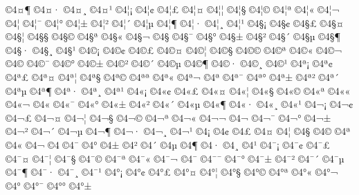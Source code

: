 {^^a94^^a4^^b6
^^a94^^a4^^b7
^^a94^^a4^^b8
^^a94^^a4^^b9
^^a94^^a6^^a1
^^a94^^a6^^a2
^^a94^^a6^^a3
^^a94^^a6^^a4
^^a94^^a6^^a6
^^a94^^a6^^a7
^^a94^^a6^^a9
^^a94^^a6^^aa
^^a94^^a6^^ab
^^a94^^a6^^ac
^^a94^^a6^^ad
^^a94^^a6^^af
^^a94^^a6^^b0
^^a94^^a6^^b1
^^a94^^a6^^b2
^^a94^^a6^^b4
^^a94^^a6^^b5
^^a94^^a6^^b6
^^a94^^a6^^b7
^^a94^^a6^^b8
^^a94^^a6^^b9
^^a94^^a7^^a1
^^a94^^a7^^a2
^^a94^^a7^^a3
^^a94^^a7^^a4
^^a94^^a7^^a6
^^a94^^a7^^a7
^^a94^^a7^^a9
^^a94^^a7^^aa
^^a94^^a7^^ab
^^a94^^a7^^ac
^^a94^^a7^^ad
^^a94^^a7^^af
^^a94^^a7^^b0
^^a94^^a7^^b1
^^a94^^a7^^b2
^^a94^^a7^^b4
^^a94^^a7^^b5
^^a94^^a7^^b6
^^a94^^a7^^b7
^^a94^^a7^^b8
^^a94^^a7^^b9
^^a94^^a9^^a1
^^a94^^a9^^a2
^^a94^^a9^^a3
^^a94^^a9^^a4
^^a94^^a9^^a6
^^a94^^a9^^a7
^^a94^^a9^^a9
^^a94^^a9^^aa
^^a94^^a9^^ab
^^a94^^a9^^ac
^^a94^^a9^^ad
^^a94^^a9^^af
^^a94^^a9^^b0
^^a94^^a9^^b1
^^a94^^a9^^b2
^^a94^^a9^^b4
^^a94^^a9^^b5
^^a94^^a9^^b6
^^a94^^a9^^b7
^^a94^^a9^^b8
^^a94^^a9^^b9
^^a94^^aa^^a1
^^a94^^aa^^a2
^^a94^^aa^^a3
^^a94^^aa^^a4
^^a94^^aa^^a6
^^a94^^aa^^a7
^^a94^^aa^^a9
^^a94^^aa^^aa
^^a94^^aa^^ab
^^a94^^aa^^ac
^^a94^^aa^^ad
^^a94^^aa^^af
^^a94^^aa^^b0
^^a94^^aa^^b1
^^a94^^aa^^b2
^^a94^^aa^^b4
^^a94^^aa^^b5
^^a94^^aa^^b6
^^a94^^aa^^b7
^^a94^^aa^^b8
^^a94^^aa^^b9
^^a94^^ab^^a1
^^a94^^ab^^a2
^^a94^^ab^^a3
^^a94^^ab^^a4
^^a94^^ab^^a6
^^a94^^ab^^a7
^^a94^^ab^^a9
^^a94^^ab^^aa
^^a94^^ab^^ab
^^a94^^ab^^ac
^^a94^^ab^^ad
^^a94^^ab^^af
^^a94^^ab^^b0
^^a94^^ab^^b1
^^a94^^ab^^b2
^^a94^^ab^^b4
^^a94^^ab^^b5
^^a94^^ab^^b6
^^a94^^ab^^b7
^^a94^^ab^^b8
^^a94^^ab^^b9
^^a94^^ac^^a1
^^a94^^ac^^a2
^^a94^^ac^^a3
^^a94^^ac^^a4
^^a94^^ac^^a6
^^a94^^ac^^a7
^^a94^^ac^^a9
^^a94^^ac^^aa
^^a94^^ac^^ab
^^a94^^ac^^ac
^^a94^^ac^^ad
^^a94^^ac^^af
^^a94^^ac^^b0
^^a94^^ac^^b1
^^a94^^ac^^b2
^^a94^^ac^^b4
^^a94^^ac^^b5
^^a94^^ac^^b6
^^a94^^ac^^b7
^^a94^^ac^^b8
^^a94^^ac^^b9
^^a94^^ad^^a1
^^a94^^ad^^a2
^^a94^^ad^^a3
^^a94^^ad^^a4
^^a94^^ad^^a6
^^a94^^ad^^a7
^^a94^^ad^^a9
^^a94^^ad^^aa
^^a94^^ad^^ab
^^a94^^ad^^ac
^^a94^^ad^^ad
^^a94^^ad^^af
^^a94^^ad^^b0
^^a94^^ad^^b1
^^a94^^ad^^b2
^^a94^^ad^^b4
^^a94^^ad^^b5
^^a94^^ad^^b6
^^a94^^ad^^b7
^^a94^^ad^^b8
^^a94^^ad^^b9
^^a94^^af^^a1
^^a94^^af^^a2
^^a94^^af^^a3
^^a94^^af^^a4
^^a94^^af^^a6
^^a94^^af^^a7
^^a94^^af^^a9
^^a94^^af^^aa
^^a94^^af^^ab
^^a94^^af^^ac
^^a94^^af^^ad
^^a94^^af^^af
^^a94^^af^^b0
^^a94^^af^^b1
^^a94^^af^^b2
^^a94^^af^^b4
^^a94^^af^^b5
^^a94^^af^^b6
^^a94^^af^^b7
^^a94^^af^^b8
^^a94^^af^^b9
^^a94^^b0^^a1
^^a94^^b0^^a2
^^a94^^b0^^a3
^^a94^^b0^^a4
^^a94^^b0^^a6
^^a94^^b0^^a7
^^a94^^b0^^a9
^^a94^^b0^^aa
^^a94^^b0^^ab
^^a94^^b0^^ac
^^a94^^b0^^ad
^^a94^^b0^^af
^^a94^^b0^^b0
^^a94^^b0^^b1
}
